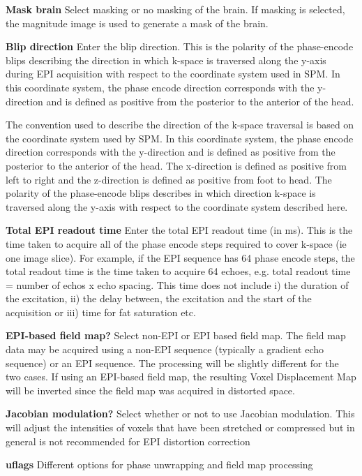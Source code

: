 \textbf{Mask brain}
Select masking or no masking of the brain. If masking is selected, the magnitude image is used to generate a mask of the brain.


\textbf{Blip direction}
Enter the blip direction. This is the polarity of the phase-encode blips describing the direction in which k-space is traversed along the y-axis during EPI acquisition with respect to the coordinate system used in SPM. In this coordinate system, the phase encode direction corresponds with the y-direction and is defined as positive from the posterior to the anterior of the head.

The convention used to describe the direction of the k-space traversal is based on the coordinate system used by SPM. In this coordinate system, the phase encode direction corresponds with the y-direction and is defined as positive from the posterior to the anterior of the head. The x-direction is defined as positive from left to right and the z-direction is defined as positive from foot to head. The polarity of the phase-encode blips describes in which direction k-space is traversed along the y-axis with respect to the coordinate system described here. 

\textbf{Total EPI readout time}
Enter the total EPI readout time (in ms). This is the time taken to acquire all of the phase encode steps required to cover k-space (ie one image slice). For example, if the EPI sequence has 64 phase encode steps, the total readout time is the time taken to acquire 64 echoes, e.g. total readout time = number of echos x echo spacing. This time does not include i) the duration of the excitation, ii) the delay between, the excitation and the start of the acquisition or iii) time for fat saturation etc.


\textbf{EPI-based field map?}
Select non-EPI or EPI based field map. The field map data may be acquired using a non-EPI sequence (typically a gradient echo sequence) or an EPI sequence. The processing will be slightly different for the two cases. If using an EPI-based field map, the resulting Voxel Displacement Map will be inverted since the field map was acquired in distorted space.


\textbf{Jacobian modulation?}
Select whether or not to use Jacobian modulation. This will adjust the intensities of voxels that have been stretched or compressed but in general is not recommended for EPI distortion correction


\textbf{uflags}
Different options for phase unwrapping and field map processing



